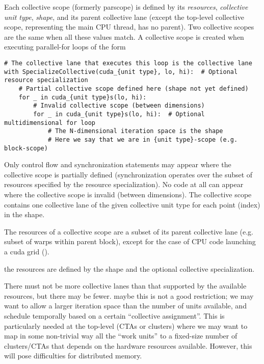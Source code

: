 \filbreak
{} Each collective scope (formerly parscope) is defined by its \textit{resources}, \textit{collective unit type}, \textit{shape}, and its parent collective lane (except the top-level collective scope, representing the main CPU thread, has no parent). Two collective scopes are the same when all these values match. A collective scope is created when executing parallel-for loops of the form

{\color{lightttColor}
\begin{verbatim}
# The collective lane that executes this loop is the collective lane
with SpecializeCollective(cuda_{unit type}, lo, hi):  # Optional resource specialization
    # Partial collective scope defined here (shape not yet defined)
    for _ in cuda_{unit type}s(lo, hi):
        # Invalid collective scope (between dimensions)
        for _ in cuda_{unit type}s(lo, hi):  # Optional multidimensional for loop
            # The N-dimensional iteration space is the shape
            # Here we say that we are in {unit type}-scope (e.g. block-scope)
\end{verbatim}
}

\filbreak
Only control flow and synchronization statements may appear where the collective scope is partially defined (synchronization operates over the subset of resources specified by the resource specialization).
No code at all can appear where the collective scope is invalid (between dimensions).
The collective scope contains one collective lane of the given collective unit type for each point (index) in the shape.

The resources of a collective scope are a subset of its parent collective lane (e.g. subset of warps within parent block), except for the case of CPU code launching a cuda grid ().

the resources are defined by the shape and the optional collective specialization.

There must not be more collective lanes than that supported by the available resources, but there may be fewer.
 maybe this is not a good restriction; we may want to allow a larger iteration space than the number of units available, and schedule temporally based on a certain ``collective assignment''.
This is particularly needed at the top-level (CTAs or clusters) where we may want to map in some non-trivial way all the ``work units'' to a fixed-size number of clusters/CTAs that depends on the hardware resources available.
However, this will pose difficulties for distributed memory.

